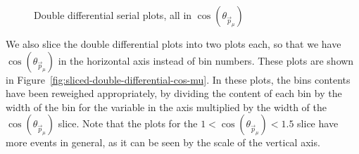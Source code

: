 \documentclass{article}
\begin{document}
\begin{figure}
    \caption{Double differential serial plots, all in $\cos(\theta_{\vec{p}_{\mu}})$}
    \label{fig:double-differential-cos-mu}
\end{figure}

We also slice the double differential plots into two plots each, so that we have $\cos(\theta_{\vec{p}_{\mu}})$ in the horizontal axis instead of bin numbers. These plots are shown in Figure~\ref{fig:sliced-double-differential-cos-mu}. In these plots, the bins contents have been reweighed appropriately, by dividing the content of each bin by the width of the bin for the variable in the axis multiplied by the width of the $\cos(\theta_{\vec{p}_{\mu}})$ slice. Note that the plots for the $1 < \cos(\theta_{\vec{p}_{\mu}}) < 1.5$ slice have more events in general, as it can be seen by the scale of the vertical axis. 
\end{document}
